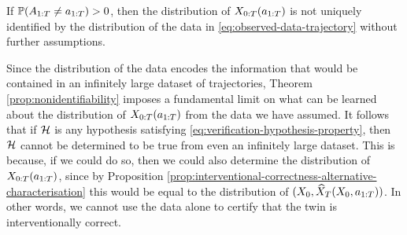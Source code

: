 \begin{theorem} \label{prop:nonidentifiability}
    If $\mathbb{P}(A_{1:T} \neq a_{1:T}) > 0$, then the distribution of $X_{0:T}(a_{1:T})$ is not uniquely identified by the distribution of the data in \eqref{eq:observed-data-trajectory} without further assumptions.
\end{theorem}


Since the distribution of the data encodes the information that would be contained in an infinitely large dataset of trajectories, Theorem \ref{prop:nonidentifiability} imposes a fundamental limit on what can be learned about the distribution of $X_{0:T}(a_{1:T})$ from the data we have assumed.
It follows that if $\mathcal{H}$ is any hypothesis satisfying \eqref{eq:verification-hypothesis-property}, then $\mathcal{H}$ cannot be determined to be true from even an infinitely large dataset.
This is because, if we could do so, then we could also determine the distribution of $X_{0:T}(a_{1:T})$, since by Proposition \ref{prop:interventional-correctness-alternative-characterisation} this would be equal to the distribution of $(X_0, \widehat{X}_{T}(X_0, a_{1:T}))$.
In other words, we cannot use the data alone to certify that the twin is interventionally correct.



